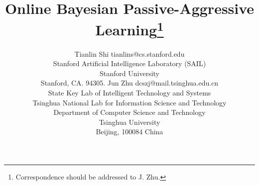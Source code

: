 \documentclass[twoside,11pt]{article}
\begin{document}
\title{Online Bayesian Passive-Aggressive Learning\thanks{Correspondence should be addressed to J. Zhu.}}

\author{\name Tianlin Shi \email tianlins@cs.stanford.edu \\
       \addr Stanford Artificial Intelligence Laboratory (SAIL)\\
       Stanford University \\
       Stanford, CA. 94305.
       \AND
       \name Jun Zhu \email dcszj@mail.tsinghua.edu.cn \\
       \addr State Key Lab of Intelligent Technology and Systems \\
       \addr Tsinghua National Lab for Information Science and Technology \\
       \addr Department of Computer Science and Technology\\
       Tsinghua University \\
       Beijing, 100084 China}

\editor{}

\maketitle
\end{document}
